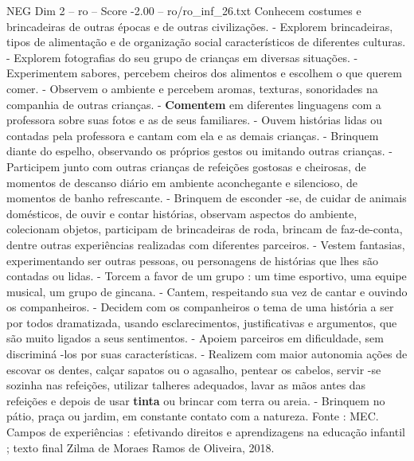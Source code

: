 \begin{textsample}{NEG Dim 2 – ro – Score -2.00 – ro/ro\_inf\_26.txt}
Conhecem costumes e brincadeiras de outras épocas e de outras civilizações. - Explorem brincadeiras, tipos de alimentação e de organização social característicos de diferentes culturas. - Explorem fotografias do seu grupo de crianças em diversas situações. - Experimentem sabores, percebem cheiros dos alimentos e escolhem o que querem comer. - Observem o ambiente e percebem aromas, texturas, sonoridades na companhia de outras crianças. - \textbf{Comentem} em diferentes linguagens com a professora sobre suas fotos e as de seus familiares. - Ouvem histórias lidas ou contadas pela professora e cantam com ela e as demais crianças. - Brinquem diante do espelho, observando os próprios gestos ou imitando outras crianças. - Participem junto com outras crianças de refeições gostosas e cheirosas, de momentos de descanso diário em ambiente aconchegante e silencioso, de momentos de banho refrescante. - Brinquem de esconder -se, de cuidar de animais domésticos, de ouvir e contar histórias, observam aspectos do ambiente, colecionam objetos, participam de brincadeiras de roda, brincam de faz-de-conta, dentre outras experiências realizadas com diferentes parceiros. - Vestem fantasias, experimentando ser outras pessoas, ou personagens de histórias que lhes são contadas ou lidas. - Torcem a favor de um grupo : um time esportivo, uma equipe musical, um grupo de gincana. - Cantem, respeitando sua vez de cantar e ouvindo os companheiros. - Decidem com os companheiros o tema de uma história a ser por todos dramatizada, usando esclarecimentos, justificativas e argumentos, que são muito ligados a seus sentimentos. - Apoiem parceiros em dificuldade, sem discriminá -los por suas características. - Realizem com maior autonomia ações de escovar os dentes, calçar sapatos ou o agasalho, pentear os cabelos, servir -se sozinha nas refeições, utilizar talheres adequados, lavar as mãos antes das refeições e depois de usar \textbf{tinta} ou brincar com terra ou areia. - Brinquem no pátio, praça ou jardim, em constante contato com a natureza.
Fonte : MEC.
Campos de experiências : efetivando direitos e aprendizagens na educação infantil ; texto final Zilma de Moraes Ramos de Oliveira, 2018.

\end{textsample}
